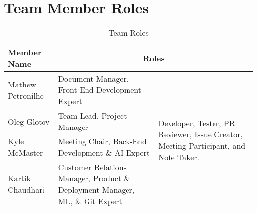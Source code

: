 \documentclass{article}
\begin{document}
\section{Team Member Roles}
\begin{table}[H]
  \centering
  \begin{tabular}{|p{3cm}|p{6cm}|p{3cm}|}
    \hline
    \textbf{Member Name} & \multicolumn{2}{c|}{\textbf{Roles}} \\
    \hline
    Mathew Petronilho  & Document Manager, Front-End Development Expert & \multirow{4}{*}{\parbox{3cm}{Developer, Tester, PR Reviewer, Issue Creator, Meeting Participant, and Note Taker.}}\\
    \cline{1-2} 
    Oleg Glotov & Team Lead, Project Manager & \\
    \cline{1-2} 
    Kyle McMaster & Meeting Chair, Back-End Development \& AI Expert  & \\
    \cline{1-2}
    Kartik Chaudhari & Customer Relations Manager, Product \& Deployment Manager, ML, \& Git Expert & \\
    \hline
  \end{tabular}
  \caption{Team Roles}
\end{table}
\end{document}
